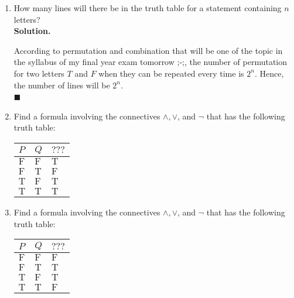 \documentclass{report}
\newcommand{\sol}{\vspace{1em}\\\textbf{Solution.}\vspace{0.5em}}
\newcommand{\qed}{‎\\‎\hfill$\blacksquare$\vspace{1em}}
\begin{document}
\begin{enumerate}[leftmargin=*]
    \item How many lines will there be in the truth table for a statement containing $n$
          letters? \sol{}

          According to permutation and combination that will be one of the topic in the
          syllabus of my final year exam tomorrow ;-;, the number of permutation for two
          letters $T$ and $F$ when they can be repeated every time is $2^n$. Hence, the
          number of lines will be $2^n$. \qed
    \item Find a formula involving the connectives $\wedge, \vee$, and $\neg$ that has
          the following truth table:
          \begin{center}
              \begin{tabular}{lll}
                  $P$                 & $Q$          & $? ? ?$      \\
                  \hline $\mathrm{F}$ & $\mathrm{F}$ & $\mathrm{T}$ \\
                  $\mathrm{F}$        & $\mathrm{T}$ & $\mathrm{F}$ \\
                  $\mathrm{T}$        & $\mathrm{F}$ & $\mathrm{T}$ \\
                  $\mathrm{T}$        & $\mathrm{T}$ & $\mathrm{T}$
              \end{tabular}
          \end{center}
    \item Find a formula involving the connectives $\wedge, \vee$, and $\neg$ that has
          the following truth table:
          \begin{center}
              \begin{tabular}{lll}
                  $P$                 & $Q$          & $? ? ?$      \\
                  \hline $\mathrm{F}$ & $\mathrm{F}$ & $\mathrm{F}$ \\
                  $\mathrm{F}$        & $\mathrm{T}$ & $\mathrm{T}$ \\
                  $\mathrm{T}$        & $\mathrm{F}$ & $\mathrm{T}$ \\
                  $\mathrm{T}$        & $\mathrm{T}$ & $\mathrm{F}$
              \end{tabular}
          \end{center}
\end{enumerate}
\end{document}
